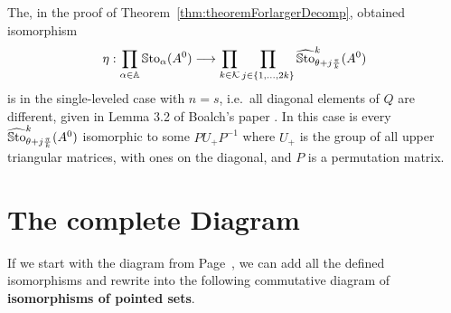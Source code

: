 \begin{rem}
  The, in the proof of Theorem~\ref{thm:theoremForlargerDecomp}, obtained
  isomorphism
  \[
    \eta: \prod_{\alpha\in\mathbb{A}}\operatorname{\mathbb{S}to}_{\alpha}(A^0) \longrightarrow
    \prod_{k\in\mathcal{K}} \prod_{j\in\{1,\dots,2k\}}
    \widehat{\operatorname{\mathbb{S}to}}_{\theta+j\frac{\pi}{k}}^k(A^0)
  \]
  is in the single-leveled case with $n=s$, i.e.\ all diagonal elements of
  $Q$ are different, given in Lemma 3.2 of Boalch's paper
  \cite[Lem.3.2]{boalch}.
  In this case is every $\widehat{\operatorname{\mathbb{S}to}}_{\theta+j\frac{\pi}{k}}^k(A^0)$ isomorphic
  to some $PU_+P^{-1}$ where $U_+$ is the group of all upper triangular
  matrices, with ones on the diagonal, and $P$ is a permutation matrix.
\end{rem}

\section{The complete Diagram}\label{sec:theCompleteDiagram}
If we start with the diagram from Page~\pageref{page:ofPreDiagram}, we can add
all the defined isomorphisms and rewrite into the following commutative
diagram of \textbf{isomorphisms of pointed sets}.
